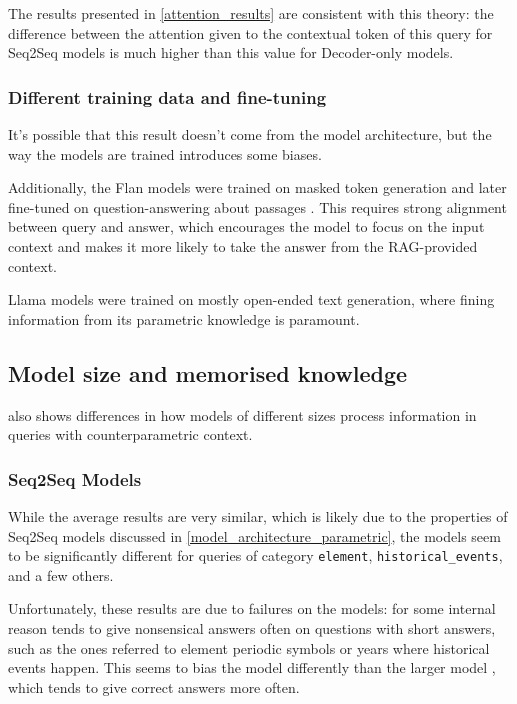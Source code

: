 The results presented in \cref{attention_results} are consistent with this theory: the difference between the attention given to the contextual token of this query for Seq2Seq models is much higher than this value for Decoder-only models.

\subsubsection{Different training data and fine-tuning}

It's possible that this result doesn't come from the model architecture, but the way the models are trained introduces some biases.

Additionally, the Flan models were trained on masked token generation and later fine-tuned on question-answering about passages \citep{flant5}.
This requires strong alignment between query and answer, which encourages the model to focus on the input context and makes it more likely to take the answer from the RAG-provided context.

Llama models were trained on mostly open-ended text generation, where fining information from its parametric knowledge is paramount.

\subsection{Model size and memorised knowledge}
\label{model_size_parametric}

 also shows differences in how models of different sizes process information in queries with counterparametric context.

\subsubsection{Seq2Seq Models}

While the average results are very similar, which is likely due to the properties of Seq2Seq models discussed in \cref{model_architecture_parametric}, the models seem to be significantly different for queries of category \texttt{element}, \texttt{historical\_events}, and a few others.

Unfortunately, these results are due to failures on the models: for some internal reason \smallflan{} tends to give nonsensical answers often on questions with short answers, such as the ones referred to element periodic symbols or years where historical events happen.
This seems to bias the model differently than the larger model \bigflan{}, which tends to give correct answers more often.

